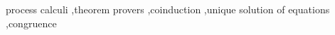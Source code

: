 \documentclass[3p]{elsarticle}
\begin{document}
\begin{frontmatter}
\begin{abstract}
\end{abstract}

\begin{keyword}
process calculi \sep theorem provers \sep coinduction \sep unique
solution of equations \sep congruence
\end{keyword}

\end{frontmatter}

\linenumbers

























\end{document}
